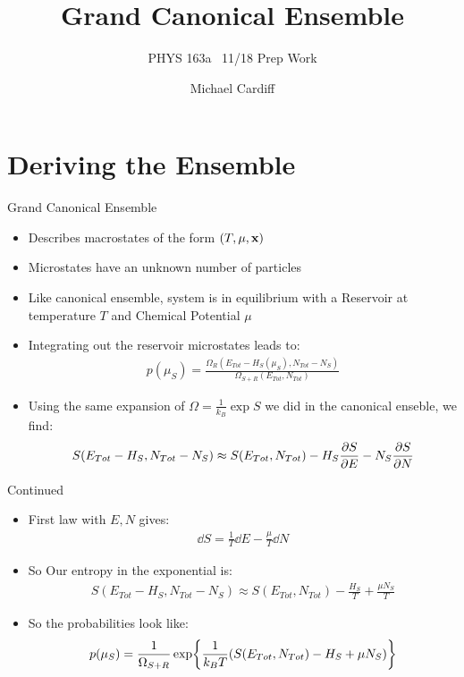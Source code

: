 \documentclass{beamer}
\title{Grand Canonical Ensemble}
\author{Michael Cardiff}
\subtitle{PHYS 163a \ 11/18 Prep Work}
\begin{document}
\begin{frame}
  \titlepage
\end{frame}

\section{Deriving the Ensemble}
\begin{frame}{Grand Canonical Ensemble}
  \begin{itemize}
  \item Describes macrostates of the form $(T,\mu,\vb{x})$
  \item Microstates have an unknown number of particles
  \item Like canonical ensemble, system is in equilibrium with a Reservoir at temperature $T$ and Chemical Potential $\mu$
  \item Integrating out the reservoir microstates leads to:
    \begin{align*}
      p(\mu_S)=\frac{\Omega_{R}(E_{Tot}-H_S(\mu_S),N_{Tot}-N_S)}
      {\Omega_{S+R}(E_{Tot},N_{Tot})}
    \end{align*}
  \item Using the same expansion of $\Omega=\frac1{k_B}\exp{S}$ we did in the canonical enseble, we find:
    \begin{align*}
      S(E_{Tot}-H_S,N_{Tot}-N_S)\approx S(E_{Tot},N_{Tot})
      -H_S\pdv{S}{E}-N_S\pdv{S}{N}
    \end{align*}
  \end{itemize}
\end{frame}
\begin{frame}{Continued}
  \begin{itemize}
  \item First law with $E,N$ gives:
    \begin{align*}
      \dd{S}=\frac1T\dd{E}-\frac\mu{T}\dd{N}
    \end{align*}
  \item So Our entropy in the exponential is:
    \begin{align*}
      S(E_{Tot}-H_S,N_{Tot}-N_S)\approx
      S(E_{Tot},N_{Tot})-\frac{H_S}{T}+\frac{\mu N_S}{T}
    \end{align*}
  \item So the probabilities look like:
    \begin{align*}
      p(\mu_S)=\frac1{\Omega_{S+R}}\exp{\frac1{k_BT}
        \qty(S(E_{Tot},N_{Tot})-H_S+\mu N_S)}
    \end{align*}
  \end{itemize}
\end{frame}
\end{document}
